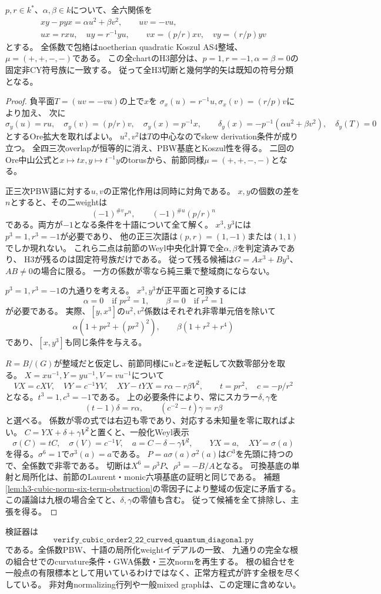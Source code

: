 \begin{theorem}\label{thm:h3-order2-22-curved-quantum-diagonal}
$p,r\in k^*$、$\alpha,\beta\in k$について、全六関係を
\begin{gather*}
 xy-pyx=\alpha u^2+\beta v^2,\qquad uv=-vu,\\
 ux=r xu,\quad uy=r^{-1}yu,\qquad
 vx=(p/r)xv,\quad vy=(r/p)yv
\end{gather*}
とする。
全係数で包絡はnoetherian quadratic Koszul AS4整域、$\mu=(+,+,-,-)$である。
この全chartのH3部分は、$p=1,r=-1,\alpha=\beta=0$の固定非CY符号族に一致する。
従って全H3切断と幾何学的矢は既知の符号分類となる。
\end{theorem}
\begin{proof}
負平面$T=(uv=-vu)$の上で$x$を
$\sigma_x(u)=r^{-1}u,\sigma_x(v)=(r/p)v$により加え、
次に
\[
 \sigma_y(u)=ru,\quad\sigma_y(v)=(p/r)v,\quad\sigma_y(x)=p^{-1}x,
 \qquad\delta_y(x)=-p^{-1}(\alpha u^2+\beta v^2),\quad\delta_y(T)=0
\]
とするOre拡大を取ればよい。
$u^2,v^2$は$T$の中心なのでskew derivation条件が成り立つ。
全四三次overlapが恒等的に消え、PBW基底とKoszul性を得る。
二回のOre中山公式と$x\mapsto t x,y\mapsto t^{-1}y$のtorusから、前節同様$\mu=(+,+,-,-)$となる。

正三次PBW語に対する$u,v$の正常化作用は同時に対角である。
$x,y$の個数の差を$n$とすると、その二weightは
\[
 (-1)^{\#v}r^n,\qquad(-1)^{\#u}(p/r)^n
\]
である。両方が$-1$となる条件を十語について全て解く。
$x^3,y^3$には$p^3=1,r^3=-1$が必要であり、
他の正三次語は$(p,r)=(1,-1)$または$(1,1)$でしか現れない。
これら二点は前節のWeyl中央化計算で全$\alpha,\beta$を判定済みであり、
H3が残るのは固定符号族だけである。
従って残る候補は$G=A x^3+B y^3$、$AB\ne0$の場合に限る。
一方の係数が零なら純三乗で整域商にならない。

$p^3=1,r^3=-1$の九通りを考える。
$x^3,y^3$が正平面と可換するには
\[
 \alpha=0\quad\text{if }pr^2=1,\qquad
 \beta=0\quad\text{if }r^2=1
\]
が必要である。
実際、$[y,x^3]$の$u^2,v^2$係数はそれぞれ非零単元倍を除いて
\[
 \alpha(1+pr^2+(pr^2)^2),\qquad
 \beta(1+r^2+r^4)
\]
であり、$[x,y^3]$も同じ条件を与える。

$R=B/(G)$が整域だと仮定し、前節同様に$u$と$x$を逆転して次数零部分を取る。
$X=xu^{-1},Y=yu^{-1},V=vu^{-1}$について
\[
 VX=cXV,\quad VY=c^{-1}YV,\quad
 XY-tYX=r\alpha-r\beta V^2,
 \qquad t=pr^2,\quad c=-p/r^2
\]
となる。$t^3=1,c^3=-1$である。
上の必要条件により、常にスカラー$\delta,\gamma$を
\[
 (t-1)\delta=r\alpha,\qquad(c^{-2}-t)\gamma=r\beta
\]
と選べる。
係数が零の式では右辺も零であり、対応する未知量を零に取ればよい。
$C=YX+\delta+\gamma V^2$と置くと、一般化Weyl表示
\[
 \sigma(C)=tC,\quad\sigma(V)=c^{-1}V,\quad
 a=C-\delta-\gamma V^2,\qquad YX=a,\quad XY=\sigma(a)
\]
を得る。$\sigma^6=1$で$\sigma^3(a)=a$である。
$P=a\sigma(a)\sigma^2(a)$は$C^3$を先頭に持つので、全係数で非零である。
切断は$X^6=\rho^3P$、$\rho^3=-B/A$となる。
可換基底の単射と局所化は、前節のLaurent・monic六項基底の証明と同じである。
補題\ref{lem:h3-cubic-norm-six-term-obstruction}の零因子により整域の仮定に矛盾する。
この議論は九根の場合全てと、$\delta,\gamma$の零値も含む。
従って候補を全て排除し、主張を得る。
\end{proof}

検証器は
\[
 \texttt{verify\_cubic\_order2\_22\_curved\_quantum\_diagonal.py}
\]
である。全係数PBW、十語の局所化weightイデアルの一致、
九通りの完全な根の組合せでのcurvature条件・GWA係数・三次normを再生する。
根の組合せを一般点の有限標本として用いているわけではなく、正常方程式が許す全根を尽くしている。
非対角normalizing行列や一般mixed graphは、この定理に含めない。
